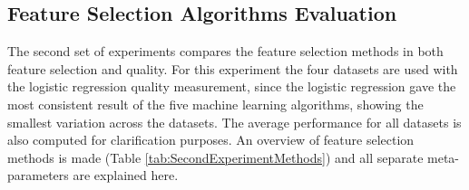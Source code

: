 \documentclass[10pt,a4paper]{report}
\begin{document}
	\subsection{Feature Selection Algorithms Evaluation}
	\label{FSsubsec:FeatureSelectionAlgorithmsEvaluation}
	
	The second set of experiments compares the feature selection methods in both feature selection and quality. For this experiment the four datasets are used with the logistic regression quality measurement, since the logistic regression gave the most consistent result of the five machine learning algorithms, showing the smallest variation across the datasets. The average performance for all datasets is also computed for clarification purposes. An overview of feature selection methods is made (Table \ref{tab:SecondExperimentMethods}) and all separate meta-parameters are explained here.
	
\end{document}
